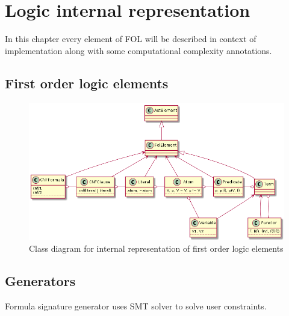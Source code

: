 \chapter{Logic internal representation}
\label{chap:LogicInternalRepresentation}

In this chapter every element of \gls{FOL} will be described in context of implementation along with some computational complexity annotations.

\section{First order logic elements}

\begin{figure}[H]
\begin{centering}
  \includegraphics[width=\textwidth]{logic-formula-generator/fol/cnf_fol_elements.png}
  \caption{Class diagram for internal representation of first order logic elements}
\end{centering}
\end{figure}

\section{Generators}

Formula signature generator uses \gls{SMT} solver to solve user constraints. 

